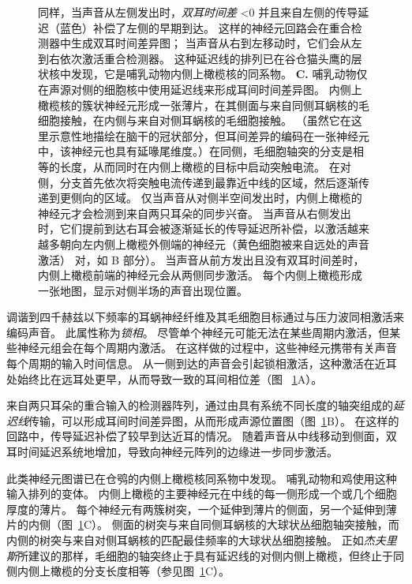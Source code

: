 \begin{figure}[htbp]
{		同样，当声音从左侧发出时，\textit{双耳时间差} <0 并且来自左侧的传导延迟（蓝色）补偿了左侧的早期到达。
		这样的神经元回路会在重合检测器中生成双耳时间差异图；
		当声音从右到左移动时，它们会从左到右依次激活重合检测器。
		这种延迟线的排列已在谷仓猫头鹰的层状核中发现，它是哺乳动物内侧上橄榄核的同系物。
		\textbf{C.} 哺乳动物仅在声源对侧的细胞核中使用延迟线来形成耳间时间差异图。
		内侧上橄榄核的簇状神经元形成一张薄片，在其侧面与来自同侧耳蜗核的毛细胞接触，在内侧与来自对侧耳蜗核的毛细胞接触。 
		（虽然它在这里示意性地描绘在脑干的冠状部分，但耳间差异的编码在一张神经元中，该神经元也具有延喙尾维度。）在同侧，毛细胞轴突的分支是相等的长度，从而同时在内侧上橄榄的目标中启动突触电流。
		在对侧，分支首先依次将突触电流传递到最靠近中线的区域，然后逐渐传递到更侧向的区域。
		仅当声音从对侧半空间发出时，内侧上橄榄的神经元才会检测到来自两只耳朵的同步兴奋。
		当声音从右侧发出时，它们提前到达右耳会被逐渐延长的传导延迟所补偿，以激活越来越多朝向左内侧上橄榄外侧端的神经元（黄色细胞被来自远处的声音激活） 对，如 B 部分）。
		当声音从前方发出且没有双耳时间差时，内侧上橄榄前端的神经元会从两侧同步激活。
		每个内侧上橄榄形成一张地图，显示对侧半场的声音出现位置\cite{yin2002neural}。}
	\label{fig:28_5}
\end{figure}


调谐到四千赫兹以下频率的耳蜗神经纤维及其毛细胞目标通过与压力波同相激活来编码声音。
此属性称为\textit{锁相}。
尽管单个神经元可能无法在某些周期内激活，但某些神经元组会在每个周期内激活。
在这样做的过程中，这些神经元携带有关声音每个周期的输入时间信息。 
从一侧到达的声音会引起锁相激活，这种激活在近耳处始终比在远耳处更早，从而导致一致的耳间相位差（图 ~\ref{fig:28_5}A）。


来自两只耳朵的重合输入的检测器阵列，通过由具有系统不同长度的轴突组成的\textit{延迟线}传输，可以形成耳间时间差异图，从而形成声源位置图\cite{jeffress1948place}（图~\ref{fig:28_5}B）。
在这样的回路中，传导延迟补偿了较早到达近耳的情况。
随着声音从中线移动到侧面，双耳时间延迟系统地增加，导致向神经元阵列的边缘进一步同步激活。


此类神经元图谱已在仓鸮的内侧上橄榄核同系物中发现。
哺乳动物和鸡使用这种输入排列的变体。
内侧上橄榄的主要神经元在中线的每一侧形成一个或几个细胞厚度的薄片。 
每个神经元有两簇树突，一个延伸到薄片的侧面，另一个延伸到薄片的内侧（图~\ref{fig:28_5}C）。
侧面的树突与来自同侧耳蜗核的大球状丛细胞轴突接触，而内侧的树突与来自对侧耳蜗核的匹配最佳频率的大球状丛细胞接触。
正如\textit{杰夫里斯}所建议的那样，毛细胞的轴突终止于具有延迟线的对侧内侧上橄榄，但终止于同侧内侧上橄榄的分支长度相等（参见图~\ref{fig:28_5}C）。


